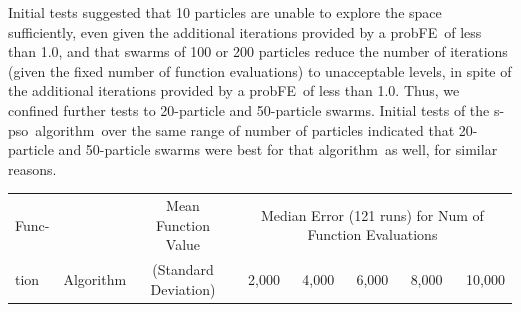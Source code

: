 \documentclass[a4paper,twoside]{article}
\newcommand{\fncevals}{function evaluations}
\newcommand{\pfe}{{probFE}}
\newcommand{\spso}{{\sc s-pso}}
\newcommand{\alg}{algorithm}
\begin{document}
Initial tests suggested that 10 particles are unable to explore the space sufficiently, even given the additional iterations provided by a \pfe\ of less than 1.0, and that swarms of 100 or 200 particles reduce the number of iterations (given the fixed number of \fncevals) to unacceptable levels, in spite of the additional iterations provided by a \pfe\ of less than 1.0. Thus, we confined further tests to 20-particle and 50-particle swarms.  Initial tests of the \spso\ \alg\ over the same range of number of particles indicated that 20-particle and 50-particle swarms were best for that \alg\ as well, for similar reasons.



\begin{table}
\begin{tabular}{|| l | l | r | r | r | r | r | r ||}

\hline \hline \hline

  Func-  &              & \multicolumn{1}{c|}{Mean Function Value}  & \multicolumn{5}{c||}{Median Error (121 runs) for Num of Function Evaluations}\\ 
                                                                      \cline{4-8}
  tion   &  Algorithm   & \multicolumn{1}{c|}{(Standard Deviation)} & 2,000 & 4,000 & 6,000 & 8,000 & 10,000 \\

\hline \hline 


\end{tabular}
\end{table}
\end{document}
